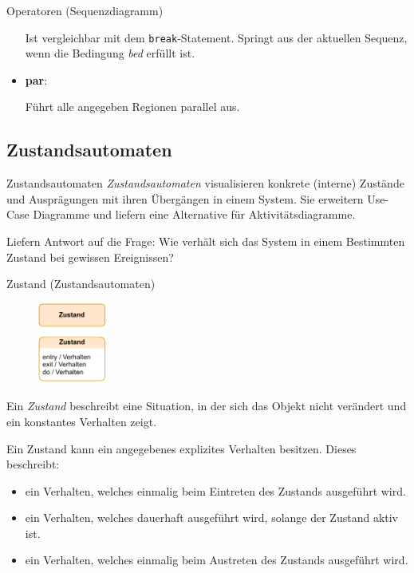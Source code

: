 \begin{defi}{Operatoren (Sequenzdiagramm)}
\begin{itemize}
              Ist vergleichbar mit dem \texttt{break}-Statement.
              Springt aus der aktuellen Sequenz, wenn die Bedingung \emph{bed} erfüllt ist.
        \item \textbf{par}:

              Führt alle angegeben Regionen parallel aus.
    \end{itemize}
\end{defi}

\subsection{Zustandsautomaten}

\begin{defi}{Zustandsautomaten}
    \emph{Zustandsautomaten} visualisieren konkrete (interne) Zustände und Ausprägungen mit ihren Übergängen in einem System.
    Sie erweitern Use-Case Diagramme und liefern eine Alternative für Aktivitätsdiagramme.

    Liefern Antwort auf die Frage:
    Wie verhält sich das System in einem Bestimmten Zustand bei gewissen Ereignissen?
\end{defi}

\begin{defi}{Zustand (Zustandsautomaten)}
    \begin{figure}
        \centering
        \includegraphics[width=0.2\textwidth]{includes/figures/defi_diagrams_state.pdf}
    \end{figure}
    Ein \emph{Zustand} beschreibt eine Situation, in der sich das Objekt nicht verändert und ein konstantes Verhalten zeigt.

    Ein Zustand kann ein angegebenes explizites Verhalten besitzen.
    Dieses beschreibt:
    \begin{itemize}
        \item ein Verhalten, welches einmalig beim Eintreten des Zustands ausgeführt wird.
        \item ein Verhalten, welches dauerhaft ausgeführt wird, solange der Zustand aktiv ist.
        \item ein Verhalten, welches einmalig beim Austreten des Zustands ausgeführt wird.
    \end{itemize}
\end{defi}

